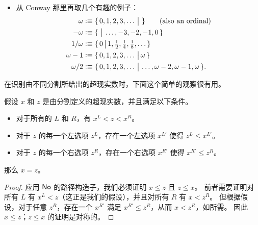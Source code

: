 \begin{itemize}
  我们通过关于 $\ord$ 的良基递归（\cref{thm:wfrec}）定义 $\iota_{\ord}:\ord\to\NO$\label{ord-into-surreals}：
  \begin{equation*}
    \iota_{\ord}(A) \defeq
    \surr{\iota_{\ord}(\ordsl A a) \text{ for all } a:A}{}.
  \end{equation*}
  同样由简单性定理可知，将 $\iota_{\ord}$ 限制在有限序数上与 $\iota_{\nat}$ 一致。
  （但我们提醒读者，与上面的例子不同，除非将其限制到更小的一类序数上，否则 $\iota_{\ord}$ 并非构造性地单的；参见 \cref{ex:ord-into-surreals,ex:hiit-plump}。）
\item 从 Conway 那里再取几个有趣的例子：
  \begin{align*}
    \omega &\vcentcolon\equiv \{\,0,1,2,3,\dots\,\big|\,\,\} \qquad\text{(also an ordinal)}\\
    -\omega &\vcentcolon\equiv \{\,\,\big|\,\dots,-3,-2,-1,0\,\}\\
    1/\omega &\vcentcolon\equiv \textstyle\{\,0\,\big|\,1,\frac12,\frac14,\frac18,\dots\,\}\\
    \omega-1 &\vcentcolon\equiv \{\,0,1,2,3,\dots\,\big|\,\omega\,\}\\
    \omega/2 &\vcentcolon\equiv \{\,0,1,2,3,\dots\,\big|\,\dots,\omega-2,\omega-1,\omega\,\}.
  \end{align*}
\end{itemize}

在识别由不同分割所给出的超现实数时，下面这个简单的观察很有用。

\begin{thm}\label{thm:NO-simplicity}
  假设 $x$ 和 $z$ 是由分割定义的超现实数，并且满足以下条件。
  \begin{itemize}
  \item 对于所有的 $L$ 和 $R$，有 $x^L < z < x^R$。
  \item 对于 $z$ 的每一个左选项 $z^L$，存在一个左选项 $x^{L'}$ 使得 $z^L\le x^{L'}$。
  \item 对于 $z$ 的每一个右选项 $z^R$，存在一个右选项 $x^{R'}$ 使得 $x^{R'}\le z^R$。
  \end{itemize}
  那么 $x=z$。
\end{thm}

\begin{proof}
  应用 $\mathsf{No}$ 的路径构造子，我们必须证明 $x\le z$ 且 $z\le x$。
  前者需要证明对所有 $L$ 有 $x^L<z$（这正是我们的假设），并且对所有 $R$ 有 $x<z^R$。
  但根据假设，对于任意 $z^R$，存在一个 $x^{R'}$ 满足 $x^{R'}\le z^R$，从而 $x<z^R$，如所需。
  因此 $x\le z$；$z\le x$ 的证明是对称的。
\end{proof}

